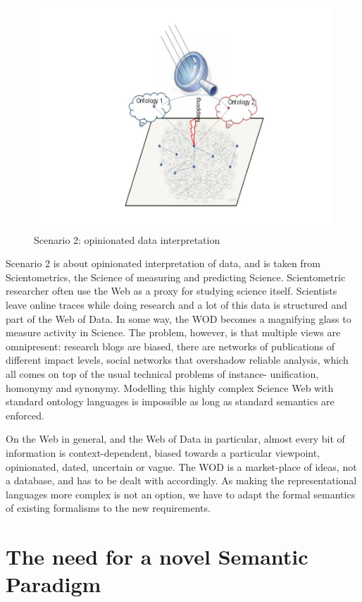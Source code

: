 \documentclass[letterpaper]{article}
\begin{document}
\begin{figure}[]
\includegraphics[width=\linewidth]{scenario2}
\caption{Scenario 2: opinionated data interpretation}
	\label{fig:ontograph}
\end{figure}


Scenario 2 is about opinionated interpretation of data, and is taken from Scientometrics, the Science of measuring and predicting Science. Scientometric researcher often use the Web as a proxy for studying science itself. Scientists leave online traces while doing research and a lot of this data is structured and part of the Web of Data. In some way, the WOD becomes a magnifying glass to measure activity in Science. The problem, however, is that multiple views are omnipresent: research blogs are biased, there are networks of publications of different impact levels, social networks that overshadow reliable analysis, which all comes on top of the usual technical problems of instance- unification, homonymy and synonymy. Modelling this highly complex Science Web with standard ontology languages is impossible as long as standard semantics are enforced.

On the Web in general, and the Web of Data in particular, almost every bit of information is context-dependent, biased towards a particular viewpoint, opinionated, dated, uncertain or vague. The WOD is a market-place of ideas, not a database, and has to be dealt with accordingly. As making the representational languages more complex is not an option, we have to adapt the formal semantics of existing formalisms to the new requirements.


\section{The need for a novel Semantic Paradigm}
\end{document}

